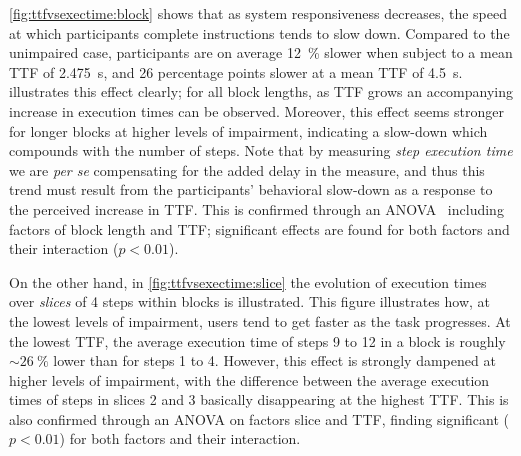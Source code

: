 \cref{fig:ttfvsexectime:block} shows that as system responsiveness decreases, the speed at which participants complete instructions tends to slow down.
Compared to the unimpaired case, participants are on average \SI{12}{\percent} slower when subject to a mean \gls{TTF} of \SI{2.475}{\second}, and \num{26} percentage points slower at a mean \gls{TTF} of \SI{4.5}{\second}.
 illustrates this effect clearly;
for all block lengths, as \gls{TTF} grows an accompanying increase in execution times can be observed.
Moreover, this effect seems stronger for longer blocks at higher levels of impairment, indicating a slow-down which compounds with the number of steps.
Note that by measuring \emph{step execution time} we are \emph{per se} compensating for the added delay in the measure, and thus this trend must result from the participants' behavioral slow-down as a response to the perceived increase in \gls{TTF}.
This is confirmed through an \gls{ANOVA}~\cite{fujikoshi1993two} including factors of block length and \gls{TTF}; significant effects are found for both factors and their interaction (\ensuremath{p < 0.01}).

On the other hand, in \cref{fig:ttfvsexectime:slice} the evolution of execution times over \emph{slices} of \num{4} steps within blocks is illustrated.
This figure illustrates how, at the lowest levels of impairment, users tend to get faster as the task progresses.
At the lowest \gls{TTF}, the average execution time of steps \num{9} to \num{12} in a block is roughly \ensuremath{\sim\SI{26}{\percent}} lower than for steps \num{1} to \num{4}.
However, this effect is strongly dampened at higher levels of impairment, with the difference between the average execution times of steps in slices \num{2} and \num{3} basically disappearing at the highest \gls{TTF}.
This is also confirmed through an \gls{ANOVA} on factors slice and \gls{TTF}, finding significant (\ensuremath{p < 0.01}) for both factors and their interaction.

